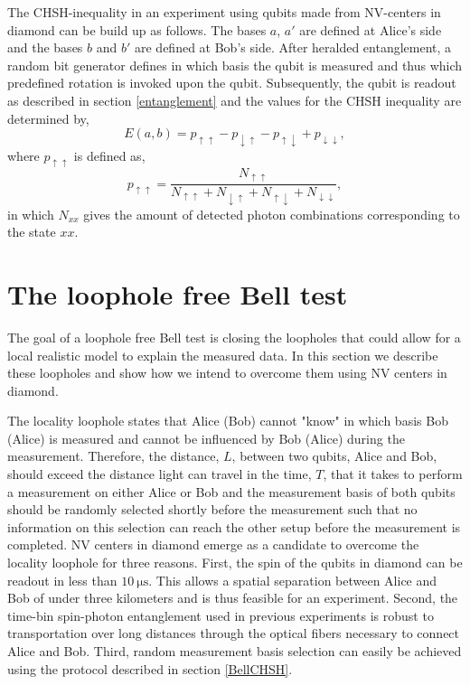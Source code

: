 The CHSH-inequality in an experiment using qubits made from NV-centers in diamond can be build up as follows. The bases $a$, $a'$ are defined at Alice's side and the bases $b$ and $b'$ are defined at Bob's side. After heralded entanglement, a random bit generator defines in which basis the qubit is measured and thus which predefined rotation is invoked upon the qubit. Subsequently, the qubit is readout as described in section \ref{entanglement} and the values for the CHSH inequality are determined by,
\begin{equation}
\label{Eab}
E(a,b) = p_{\uparrow \uparrow} -p_{\downarrow \uparrow} - p_{\uparrow \downarrow} + p_{\downarrow \downarrow}, 
\end{equation}
where $p_{\uparrow \uparrow}$ is defined as, 
\begin{equation}
\label{pfromn}
p_{\uparrow \uparrow} = \frac{N_{\uparrow \uparrow}}{N_{\uparrow \uparrow}+ N_{\downarrow \uparrow}+ N_{\uparrow \downarrow}+ N_{\downarrow \downarrow}},
\end{equation}
in which $N_{xx}$ gives the amount of detected photon combinations corresponding to the state $xx$. 

\color{tudelft-cyan}
\section{The loophole free Bell test}
\color{black}
The goal of a loophole free Bell test is closing the loopholes that could allow for a local realistic model to explain the measured data. In this section we describe these loopholes and show how we intend to overcome them using NV centers in diamond. 

The locality loophole states that Alice (Bob) cannot "know" in which basis Bob (Alice) is measured and cannot be influenced by Bob (Alice) during the measurement. Therefore, the distance, $L$, between two qubits, Alice and Bob,  should exceed the distance light can travel in the time, $T$, that it takes to perform a measurement on either Alice or Bob and the measurement basis of both qubits should be randomly selected shortly before the measurement such that no information on this selection can reach the other setup before the measurement is completed. NV centers in diamond emerge as a candidate to overcome the locality loophole for three reasons. First, the spin of the qubits in diamond can be readout in less than $\mathrm{10 \: \mu s}$. This allows a spatial separation between Alice and Bob of under three kilometers and is thus feasible for an experiment. Second, the time-bin spin-photon entanglement used in previous experiments is robust to transportation over long distances through the optical fibers necessary to connect Alice and Bob. Third, random measurement basis selection can easily be achieved using the protocol described in section \ref{BellCHSH}.

